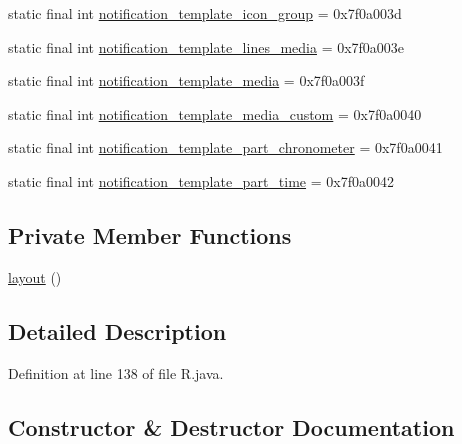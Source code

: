 \begin{DoxyCompactItemize}
\item 
static final int \mbox{\hyperlink{classandroid_1_1support_1_1v4_1_1_r_1_1layout_adb60bfc7580cc8b8c0a2c836af85cf2e}{notification\+\_\+template\+\_\+icon\+\_\+group}} = 0x7f0a003d
\item 
static final int \mbox{\hyperlink{classandroid_1_1support_1_1v4_1_1_r_1_1layout_ab9cb748d281e13c924f1ab4bca00b5d2}{notification\+\_\+template\+\_\+lines\+\_\+media}} = 0x7f0a003e
\item 
static final int \mbox{\hyperlink{classandroid_1_1support_1_1v4_1_1_r_1_1layout_a5043b85625c735625170c86528159787}{notification\+\_\+template\+\_\+media}} = 0x7f0a003f
\item 
static final int \mbox{\hyperlink{classandroid_1_1support_1_1v4_1_1_r_1_1layout_ae87875e57b9c4f61398ff57329b12161}{notification\+\_\+template\+\_\+media\+\_\+custom}} = 0x7f0a0040
\item 
static final int \mbox{\hyperlink{classandroid_1_1support_1_1v4_1_1_r_1_1layout_a15acaf706c5dcf6b2891b13c721f749d}{notification\+\_\+template\+\_\+part\+\_\+chronometer}} = 0x7f0a0041
\item 
static final int \mbox{\hyperlink{classandroid_1_1support_1_1v4_1_1_r_1_1layout_a9fb910fd134e67244f19fc9e38e6ba2c}{notification\+\_\+template\+\_\+part\+\_\+time}} = 0x7f0a0042
\end{DoxyCompactItemize}
\subsection*{Private Member Functions}
\begin{DoxyCompactItemize}
\item 
\mbox{\hyperlink{classandroid_1_1support_1_1v4_1_1_r_1_1layout_a3fd58c5dfaf0857c58e66b2f068402c2}{layout}} ()
\end{DoxyCompactItemize}


\subsection{Detailed Description}


Definition at line 138 of file R.\+java.



\subsection{Constructor \& Destructor Documentation}
\mbox{\label{classandroid_1_1support_1_1v4_1_1_r_1_1layout_a3fd58c5dfaf0857c58e66b2f068402c2}} 
